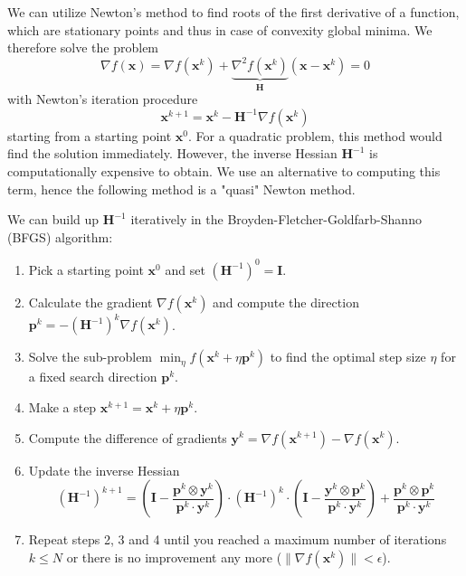 We can utilize Newton's method to find roots of the first derivative of a function, which are stationary points and thus in case of convexity global minima.
We therefore solve the problem 
\begin{equation}
    \nabla f(\mathbf{x}) = \nabla f(\mathbf{x}^k) + \underbrace{\nabla^2 f(\mathbf{x}^k)}_{\mathbf{H}} (\mathbf{x}-\mathbf{x}^k) = 0
\end{equation}
with Newton's iteration procedure 
\begin{equation}
    \mathbf{x}^{k+1} = \mathbf{x}^k  - \mathbf{H}^{-1} \nabla f(\mathbf{x}^k) 
\end{equation}
starting from a starting point $\mathbf{x}^0$. For a quadratic problem, this method would find the solution immediately. However, the inverse Hessian $\mathbf{H}^{-1}$ is computationally expensive to obtain. We use an alternative to computing this term, hence the following method is a "quasi" Newton method. 

We can build up $\mathbf{H}^{-1}$ iteratively in the Broyden-Fletcher-Goldfarb-Shanno (BFGS) \cite{Broyden1970, Fletcher1970, Goldfarb1970, Shanno1970} algorithm: 
\begin{enumerate}
    \item Pick a starting point $\mathbf{x}^0$ and set $(\mathbf{H}^{-1})^0=\mathbf{I}$.
    \item Calculate the gradient $\nabla f(\mathbf{x}^k)$ and compute the direction $\mathbf{p}^k = - (\mathbf{H}^{-1})^k \nabla f(\mathbf{x}^k)$.
    \item Solve the sub-problem $\min_{\eta} f(\mathbf{x}^k + \eta \mathbf{p}^k)$ to find the optimal step size $\eta$ for a fixed search direction $\mathbf{p}^k$.
    \item Make a step $\mathbf{x}^{k+1} = \mathbf{x}^k + \eta \mathbf{p}^k$.
    \item Compute the difference of gradients $ \mathbf{y}^k = \nabla f(\mathbf{x}^{k+1}) - \nabla f(\mathbf{x}^k)$.
    \item Update the inverse Hessian 
    \begin{equation}
        \nonumber
        (\mathbf{H}^{-1})^{k+1} = 
            \left(\mathbf{I} - \frac{\mathbf{p}^k \otimes \mathbf{y}^k}{\mathbf{p}^k \cdot \mathbf{y}^k} \right)
            \cdot
            (\mathbf{H}^{-1})^k
            \cdot
            \left(\mathbf{I} - \frac{\mathbf{y}^k \otimes \mathbf{p}^k}{\mathbf{p}^k \cdot \mathbf{y}^k} \right) 
            + 
            \frac{\mathbf{p}^k \otimes \mathbf{p}^k}{\mathbf{p}^k \cdot \mathbf{y}^k}
    \end{equation}
    \item Repeat steps 2, 3 and 4 until you reached a maximum number of iterations $k \le N$ or there is no improvement any more ($ \lVert \nabla f(\mathbf{x}^k) \rVert < \epsilon$). 
\end{enumerate}

